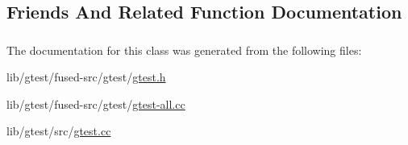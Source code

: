 \subsection{Friends And Related Function Documentation}
\hypertarget{classtesting_1_1_test_aed3c96e2bd5a46339c1cbe49a4a233ee}{
\subsubsection[{Test\-Info}]{\hspace{0.3cm}{\ttfamily [friend]}}}\label{classtesting_1_1_test_aed3c96e2bd5a46339c1cbe49a4a233ee}


The documentation for this class was generated from the following files\-:\begin{DoxyCompactItemize}
\item 
lib/gtest/fused-\/src/gtest/\hyperlink{fused-src_2gtest_2gtest_8h}{gtest.\-h}\item 
lib/gtest/fused-\/src/gtest/\hyperlink{fused-src_2gtest_2gtest-all_8cc}{gtest-\/all.\-cc}\item 
lib/gtest/src/\hyperlink{gtest_8cc}{gtest.\-cc}\end{DoxyCompactItemize}
